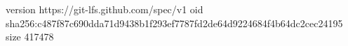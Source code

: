 version https://git-lfs.github.com/spec/v1
oid sha256:c487f87c690dda71d9438b1f293ef7787fd2de64d9224684f4b64dc2cec24195
size 417478
